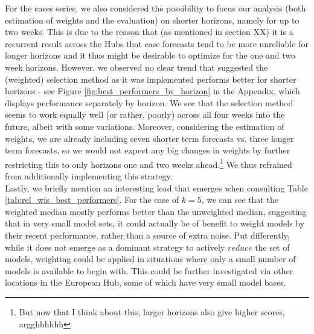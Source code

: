 For the cases series, we also considered the possibility to focus our analysis (both estimation of weights and the evaluation) on shorter horizons, namely for up to two weeks. This is due to the reason that (as mentioned in section XX) it is a recurrent result across the Hubs that case forecasts tend to be more unreliable for longer horizons and it thus might be desirable to optimize for the one and two week horizons. However, we observed no clear trend that suggested the (weighted) selection method as it was implemented performs better for shorter horizons - see Figure \ref{fig:best_performers_by_horizon} in the Appendix, which displays performance separately by horizon. We see that the selection method seems to work equally well (or rather, poorly) across all four weeks into the future, albeit with some variations. Moreover, considering the estimation of weights, we are already including seven shorter term forecasts vs. three longer term forecasts, so we would not expect any big changes in weights by further restricting this to only horizons one and two weeks ahead.\footnote{But now that I think about this, larger horizons also give higher scores, argghhhhhh} We thus refrained from additionally implementing this strategy. \medskip \\
Lastly, we briefly mention an interesting lead that emerges when consulting Table \ref{tab:rel_wis_best_performers}. For the case of $k = 5$, we can see that the weighted median mostly performs better than the unweighted median, suggesting that in very small model sets, it could actually be of benefit to weight models by their recent performance, rather than a source of extra noise. Put differently, while it does not emerge as a dominant strategy to actively $reduce$ the set of models, weighting could be applied in situations where only a small number of models is available to begin with. This could be further investigated via other locations in the European Hub, some of which have very small model bases.\\
